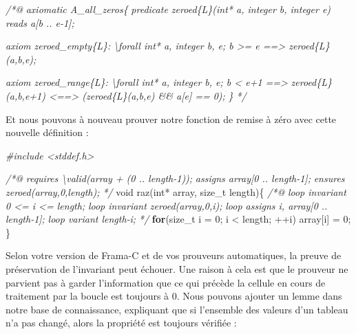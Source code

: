 \documentclass[12pt,francais,]{scrbook}
\newenvironment{Shaded}{}{}
\newcommand{\KeywordTok}[1]{\textcolor[rgb]{0.00,0.44,0.13}{\textbf{{#1}}}}
\newcommand{\DataTypeTok}[1]{\textcolor[rgb]{0.56,0.13,0.00}{{#1}}}
\newcommand{\DecValTok}[1]{\textcolor[rgb]{0.25,0.63,0.44}{{#1}}}
\newcommand{\CommentTok}[1]{\textcolor[rgb]{0.38,0.63,0.69}{\textit{{#1}}}}
\newcommand{\NormalTok}[1]{{#1}}
\begin{document}
\begin{footnotesize}\begin{Shaded}
\begin{Highlighting}[]
\CommentTok{/*@}
\CommentTok{  axiomatic A_all_zeros\{}
\CommentTok{    predicate zeroed\{L\}(int* a, integer b, integer e) reads a[b .. e-1];}

\CommentTok{    axiom zeroed_empty\{L\}:}
\CommentTok{      \textbackslash{}forall int* a, integer b, e; b >= e ==> zeroed\{L\}(a,b,e);}

\CommentTok{    axiom zeroed_range\{L\}:}
\CommentTok{      \textbackslash{}forall int* a, integer b, e; b < e+1 ==>}
\CommentTok{        zeroed\{L\}(a,b,e+1) <==> (zeroed\{L\}(a,b,e) && a[e] == 0);}
\CommentTok{  \}}
\CommentTok{*/}
\end{Highlighting}
\end{Shaded}\end{footnotesize}

Et nous pouvons à nouveau prouver notre fonction de remise à zéro avec
cette nouvelle définition :

\begin{footnotesize}\begin{Shaded}
\begin{Highlighting}[]
\CommentTok{#include <stddef.h>}

\CommentTok{/*@}
\CommentTok{  requires \textbackslash{}valid(array + (0 .. length-1));}
\CommentTok{  assigns  array[0 .. length-1];}
\CommentTok{  ensures  zeroed(array,0,length);}
\CommentTok{*/}
\DataTypeTok{void} \NormalTok{raz(}\DataTypeTok{int}\NormalTok{* array, size_t length)\{}
  \CommentTok{/*@}
\CommentTok{    loop invariant 0 <= i <= length;}
\CommentTok{    loop invariant zeroed(array,0,i);}
\CommentTok{    loop assigns i, array[0 .. length-1];}
\CommentTok{    loop variant length-i;}
\CommentTok{  */}
  \KeywordTok{for}\NormalTok{(size_t i = }\DecValTok{0}\NormalTok{; i < length; ++i)}
    \NormalTok{array[i] = }\DecValTok{0}\NormalTok{;}
\NormalTok{\}}
\end{Highlighting}
\end{Shaded}\end{footnotesize}

Selon votre version de Frama-C et de vos prouveurs automatiques, la
preuve de préservation de l'invariant peut échouer. Une raison à cela
est que le prouveur ne parvient pas à garder l'information que ce qui
précède la cellule en cours de traitement par la boucle est toujours à
0. Nous pouvons ajouter un lemme dans notre base de connaissance,
expliquant que si l'ensemble des valeurs d'un tableau n'a pas changé,
alors la propriété est toujours vérifiée :
\end{document}
